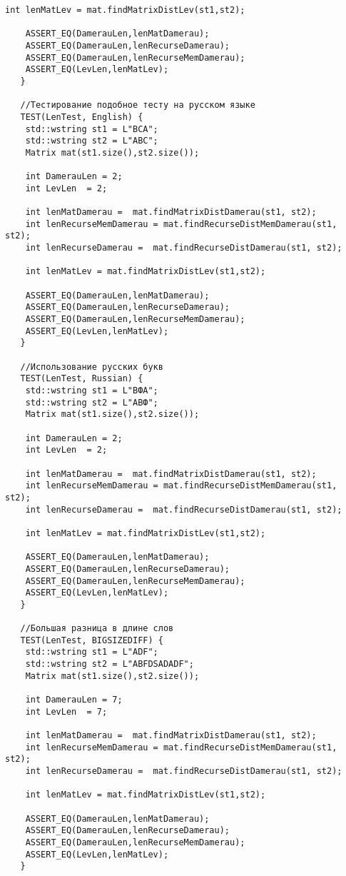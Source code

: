 \begin{lstlisting}[label=lst:unit_tests, caption=Модульные тесты]
   	int lenMatLev = mat.findMatrixDistLev(st1,st2);
   	
   	ASSERT_EQ(DamerauLen,lenMatDamerau);
   	ASSERT_EQ(DamerauLen,lenRecurseDamerau);
   	ASSERT_EQ(DamerauLen,lenRecurseMemDamerau);
   	ASSERT_EQ(LevLen,lenMatLev);
   }
   
   //Тестирование подобное тесту на русском языке
   TEST(LenTest, English) {
   	std::wstring st1 = L"BCA";
   	std::wstring st2 = L"ABC";
   	Matrix mat(st1.size(),st2.size());
   	
   	int DamerauLen = 2;
   	int LevLen  = 2;
   	
   	int lenMatDamerau =  mat.findMatrixDistDamerau(st1, st2);
   	int lenRecurseMemDamerau = mat.findRecurseDistMemDamerau(st1, st2);
   	int lenRecurseDamerau =  mat.findRecurseDistDamerau(st1, st2);
   	
   	int lenMatLev = mat.findMatrixDistLev(st1,st2);
   	
   	ASSERT_EQ(DamerauLen,lenMatDamerau);
   	ASSERT_EQ(DamerauLen,lenRecurseDamerau);
   	ASSERT_EQ(DamerauLen,lenRecurseMemDamerau);
   	ASSERT_EQ(LevLen,lenMatLev);
   }
   
   //Использование русских букв
   TEST(LenTest, Russian) {
   	std::wstring st1 = L"ВФА";
   	std::wstring st2 = L"АВФ";
   	Matrix mat(st1.size(),st2.size());
   	
   	int DamerauLen = 2;
   	int LevLen  = 2;
   	
   	int lenMatDamerau =  mat.findMatrixDistDamerau(st1, st2);
   	int lenRecurseMemDamerau = mat.findRecurseDistMemDamerau(st1, st2);
   	int lenRecurseDamerau =  mat.findRecurseDistDamerau(st1, st2);
   	
   	int lenMatLev = mat.findMatrixDistLev(st1,st2);
   	
   	ASSERT_EQ(DamerauLen,lenMatDamerau);
   	ASSERT_EQ(DamerauLen,lenRecurseDamerau);
   	ASSERT_EQ(DamerauLen,lenRecurseMemDamerau);
   	ASSERT_EQ(LevLen,lenMatLev);
   }
   
   //Большая разница в длине слов
   TEST(LenTest, BIGSIZEDIFF) {
   	std::wstring st1 = L"ADF";
   	std::wstring st2 = L"ABFDSADADF";
   	Matrix mat(st1.size(),st2.size());
   	
   	int DamerauLen = 7;
   	int LevLen  = 7;
   	
   	int lenMatDamerau =  mat.findMatrixDistDamerau(st1, st2);
   	int lenRecurseMemDamerau = mat.findRecurseDistMemDamerau(st1, st2);
   	int lenRecurseDamerau =  mat.findRecurseDistDamerau(st1, st2);
   	
   	int lenMatLev = mat.findMatrixDistLev(st1,st2);
   	
   	ASSERT_EQ(DamerauLen,lenMatDamerau);
   	ASSERT_EQ(DamerauLen,lenRecurseDamerau);
   	ASSERT_EQ(DamerauLen,lenRecurseMemDamerau);
   	ASSERT_EQ(LevLen,lenMatLev);
   }
\end{lstlisting}

